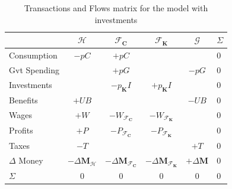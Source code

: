 \begin{table}
    \centering
    \begin{tabular}{l|cccc|l}

                       & $\mathcal{H}$                   & $\mathcal{F}_\mathbf{C}$                     & $\mathcal{F}_\mathbf{K}$                     & $\mathcal{G}$       & $\Sigma$ \\
        \midrule
        Consumption    & $-p C$                          & $+p C$                                       &                                              &                     & 0        \\
        Gvt Spending   &                                 & $+p G$                                       &                                              & $-p G$              & 0        \\
        Investments    &                                 & $-p_\mathbf{K} I $                           & $+p_\mathbf{K} I $                           &                     & 0        \\
        Benefits       & $+UB$                           &                                              &                                              & $-UB$               & 0        \\
        Wages          & $+W$                            & $-W_{\mathcal{F}_\mathbf{C}}$                & $-W_{\mathcal{F}_\mathbf{K}}$                &                     & 0        \\
        Profits        & $+P$                            & $-P_{\mathcal{F}_\mathbf{C}}$                & $-P_{\mathcal{F}_\mathbf{K}}$                &                     & 0        \\
        Taxes          &
        $-T$           &                                 &                                              & $+T$                                         & 0                              \\
        \midrule
        $\Delta$ Money & $-\Delta\mathbf{M}_\mathcal{H}$ & $-\Delta\mathbf{M}_{\mathcal{F}_\mathbf{C}}$ & $-\Delta\mathbf{M}_{\mathcal{F}_\mathbf{K}}$ & $+\Delta\mathbf{M}$ & 0        \\
        \midrule
        $\Sigma$       & 0                               & 0                                            & 0                                            & 0                   & 0        \\
    \end{tabular}
    \caption{Transactions and Flows matrix for the model with investments}
\end{table}

